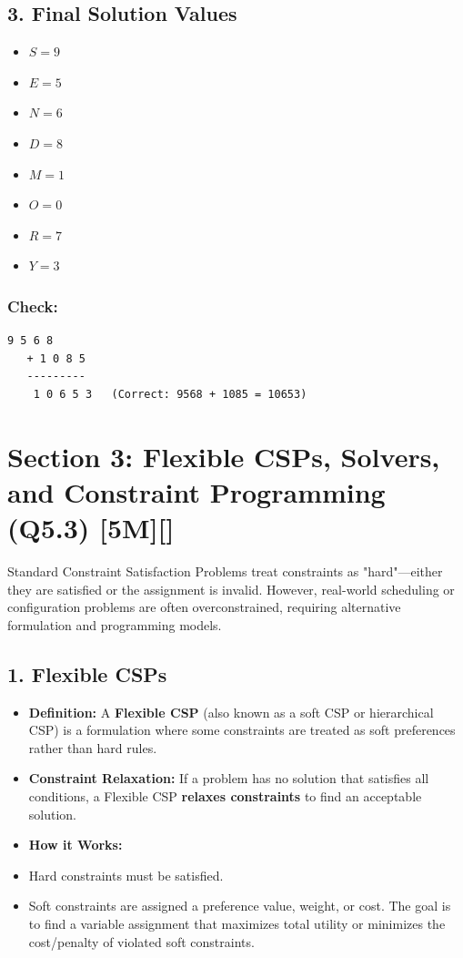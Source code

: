 \subsection{3. Final Solution Values}
\begin{itemize}
  \item   \textbf{$S = 9$}
  \item   \textbf{$E = 5$}
  \item   \textbf{$N = 6$}
  \item   \textbf{$D = 8$}
  \item   \textbf{$M = 1$}
  \item   \textbf{$O = 0$}
  \item   \textbf{$R = 7$}
  \item   \textbf{$Y = 3$}
\end{itemize}

\subsubsection{Check:}
\begin{lstlisting}
9 5 6 8
   + 1 0 8 5
   ---------
    1 0 6 5 3   (Correct: 9568 + 1085 = 10653)
\end{lstlisting}


\section{Section 3: Flexible CSPs, Solvers, and Constraint Programming (Q5.3) [5M][]}

Standard Constraint Satisfaction Problems treat constraints as "hard"—either they are satisfied or the assignment is invalid. However, real-world scheduling or configuration problems are often overconstrained, requiring alternative formulation and programming models.


\subsection{1. Flexible CSPs}
\begin{itemize}
  \item   \textbf{Definition:} A \textbf{Flexible CSP} (also known as a soft CSP or hierarchical CSP) is a formulation where some constraints are treated as soft preferences rather than hard rules.
  \item   \textbf{Constraint Relaxation:} If a problem has no solution that satisfies all conditions, a Flexible CSP \textbf{relaxes constraints} to find an acceptable solution.
  \item   \textbf{How it Works:}
  \item   Hard constraints must be satisfied.
  \item   Soft constraints are assigned a preference value, weight, or cost. The goal is to find a variable assignment that maximizes total utility or minimizes the cost/penalty of violated soft constraints.
\end{itemize}


